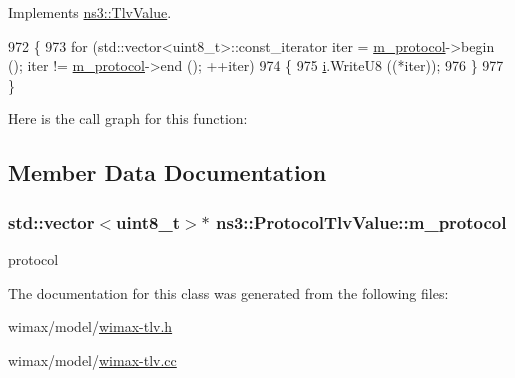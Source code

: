 Implements \hyperlink{classns3_1_1TlvValue_aeec8825728398e18337efd9cb40a2aa4}{ns3\+::\+Tlv\+Value}.


\begin{DoxyCode}
972 \{
973   \textcolor{keywordflow}{for} (std::vector<uint8\_t>::const\_iterator iter = \hyperlink{classns3_1_1ProtocolTlvValue_a16f3d8a6fc73343f52275304a5874b33}{m\_protocol}->begin (); iter != 
      \hyperlink{classns3_1_1ProtocolTlvValue_a16f3d8a6fc73343f52275304a5874b33}{m\_protocol}->end (); ++iter)
974     \{
975       \hyperlink{bernuolliDistribution_8m_a6f6ccfcf58b31cb6412107d9d5281426}{i}.WriteU8 ((*iter));
976     \}
977 \}
\end{DoxyCode}


Here is the call graph for this function\+:




\subsection{Member Data Documentation}
\subsubsection[{\texorpdfstring{m\+\_\+protocol}{m_protocol}}]{\setlength{\rightskip}{0pt plus 5cm}std\+::vector$<$uint8\+\_\+t$>$$\ast$ ns3\+::\+Protocol\+Tlv\+Value\+::m\+\_\+protocol\hspace{0.3cm}{\ttfamily [private]}}\hypertarget{classns3_1_1ProtocolTlvValue_a16f3d8a6fc73343f52275304a5874b33}{}\label{classns3_1_1ProtocolTlvValue_a16f3d8a6fc73343f52275304a5874b33}


protocol 



The documentation for this class was generated from the following files\+:\begin{DoxyCompactItemize}
\item 
wimax/model/\hyperlink{wimax-tlv_8h}{wimax-\/tlv.\+h}\item 
wimax/model/\hyperlink{wimax-tlv_8cc}{wimax-\/tlv.\+cc}\end{DoxyCompactItemize}
